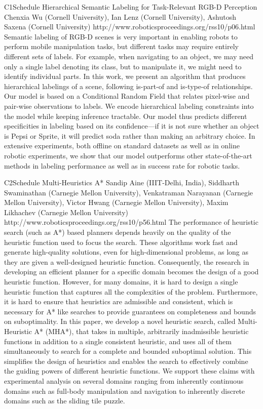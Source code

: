 \begin{spacing}{1.0}
\descriptionPaper
{C1}{Schedule}
{	
Hierarchical Semantic Labeling for Task-Relevant RGB-D Perception
}
{
Chenxia Wu (Cornell University), Ian Lenz (Cornell University), Ashutosh Saxena (Cornell University)
}
{
http://www.roboticsproceedings.org/rss10/p06.html
}
{
Semantic labeling of RGB-D scenes is very important in enabling robots to perform mobile manipulation tasks, but different tasks may require entirely different sets of labels. For example, when navigating to an object, we may need only a single label denoting its class, but to manipulate it, we might need to identify individual parts. In this work, we present an algorithm that produces hierarchical labelings of a scene, following is-part-of and is-type-of relationships. Our model is based on a Conditional Random Field that relates pixel-wise and pair-wise observations to labels. We encode hierarchical labeling constraints into the model while keeping inference tractable. Our model thus predicts different specificities in labeling based on its confidence---if it is not sure whether an object is Pepsi or Sprite, it will predict soda rather than making an arbitrary choice. In extensive experiments, both offline on standard datasets as well as in online robotic experiments, we show that our model outperforms other state-of-the-art methods in labeling performance as well as in success rate for robotic tasks.
}


\clearpage
\descriptionPaper
{C2}{Schedule}
{	
Multi-Heuristics A*
}
{
Sandip Aine (IIIT-Delhi, India), Siddharth Swaminathan (Carnegie Mellon University), Venkatraman Narayanan (Carnegie Mellon University), Victor Hwang (Carnegie Mellon University), Maxim Likhachev (Carnegie Mellon University)
}
{
http://www.roboticsproceedings.org/rss10/p56.html
}
{
The performance of heuristic search (such as A*) based planners depends heavily on the quality of the heuristic function used to focus the search. These algorithms work fast and generate high-quality solutions, even for high-dimensional problems, as long as they are given a well-designed heuristic function. Consequently, the research in developing an efficient planner for a specific domain becomes the design of a good heuristic function. However, for many domains, it is hard to design a single heuristic function that captures all the complexities of the problem. Furthermore, it is hard to ensure that heuristics are admissible and consistent, which is necessary for A* like searches to provide guarantees on completeness and bounds on suboptimality. In this paper, we develop a novel heuristic search, called Multi-Heuristic A* (MHA*), that takes in multiple, arbitrarily inadmissible heuristic functions in addition to a single consistent heuristic, and uses all of them simultaneously to search for a complete and bounded suboptimal solution. This simplifies the design of heuristics and enables the search to effectively combine the guiding powers of different heuristic functions. We support these claims with experimental analysis on several domains ranging from inherently continuous domains such as full-body manipulation and navigation to inherently discrete domains such as the sliding tile puzzle.
}




\end{spacing}
